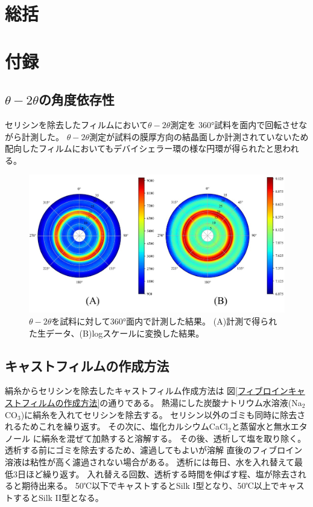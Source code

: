 \documentclass[dvipdfmx,12pt,a4paper]{jreport}
\begin{document}
	\chapter{総括}
	\chapter{付録}
	\section{$\theta-2\theta$の角度依存性}
	セリシンを除去したフィルムにおいて$\theta-2\theta$測定を
	360°試料を面内で回転させながら計測した。
	$\theta-2\theta$測定が試料の膜厚方向の結晶面しか計測されていないため
	配向したフィルムにおいてもデバイシェラー環の様な円環が得られたと思われる。
	\begin{figure}[h]
		\centering
		\includegraphics{デバイ.jpg}
		\caption{$\theta-2\theta$を試料に対して360°面内で計測した結果。
		(A)計測で得られた生データ、(B)logスケールに変換した結果。}
	\end{figure}
	\newpage
	\section{キャストフィルムの作成方法}
	絹糸からセリシンを除去したキャストフィルム作成方法は
	図\ref{フィブロインキャストフィルムの作成方法}の通りである。
	熱湯にした炭酸ナトリウム水溶液(Na$_2$CO$_3$)に絹糸を入れてセリシンを除去する。
	セリシン以外のゴミも同時に除去されるためこれを繰り返す。
	その次に、塩化カルシウムCaCl$_2$と蒸留水と無水エタノール
	に絹糸を混ぜて加熱すると溶解する。
	その後、透析して塩を取り除く。
	透析する前にゴミを除去するため、濾過してもよいが溶解
	直後のフィブロイン溶液は粘性が高く濾過されない場合がある。
	透析には毎日、水を入れ替えて最低3日ほど繰り返す。
	入れ替える回数、透析する時間を伸ばす程、塩が除去されると期待出来る。
	50℃以下でキャストするとSilk I型となり、50℃以上でキャストするとSilk II型となる。
\end{document}
